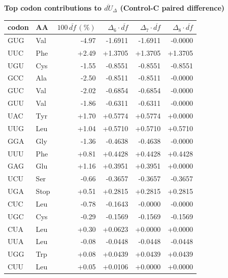 \begingroup
{}
\small
\setlength{\tabcolsep}{6pt}
\renewcommand{\arraystretch}{1.15}
\setlength{\LTleft}{0pt}
\setlength{\LTright}{0pt}
\noindent\textbf{Top codon contributions to $\overline{dU}_{\Delta}$ (Control-C paired difference)}\\
\begin{longtable}{l l r r r r}
\toprule
codon & AA & $100\,\overline{df}\,(\%)$ & $\Delta_{6}\cdot\overline{df}$ & $\Delta_{7}\cdot\overline{df}$ & $\Delta_{8}\cdot\overline{df}$ \\
\midrule
GUG & Val & -4.97 & -1.6911 & -1.6911 & -0.0000 \\
UUC & Phe & +2.49 & +1.3705 & +1.3705 & +1.3705 \\
UGU & Cys & -1.55 & -0.8551 & -0.8551 & -0.8551 \\
GCC & Ala & -2.50 & -0.8511 & -0.8511 & -0.0000 \\
GUC & Val & -2.02 & -0.6854 & -0.6854 & -0.0000 \\
GUU & Val & -1.86 & -0.6311 & -0.6311 & -0.0000 \\
UAC & Tyr & +1.70 & +0.5774 & +0.5774 & +0.0000 \\
UUG & Leu & +1.04 & +0.5710 & +0.5710 & +0.5710 \\
GGA & Gly & -1.36 & -0.4638 & -0.4638 & -0.0000 \\
UUU & Phe & +0.81 & +0.4428 & +0.4428 & +0.4428 \\
GAG & Glu & +1.16 & +0.3951 & +0.3951 & +0.0000 \\
UCU & Ser & -0.66 & -0.3657 & -0.3657 & -0.3657 \\
UGA & Stop & +0.51 & +0.2815 & +0.2815 & +0.2815 \\
CUC & Leu & -0.78 & -0.1643 & -0.0000 & -0.0000 \\
UGC & Cys & -0.29 & -0.1569 & -0.1569 & -0.1569 \\
CUA & Leu & +0.30 & +0.0623 & +0.0000 & +0.0000 \\
UUA & Leu & -0.08 & -0.0448 & -0.0448 & -0.0448 \\
UGG & Trp & +0.08 & +0.0439 & +0.0439 & +0.0439 \\
CUU & Leu & +0.05 & +0.0106 & +0.0000 & +0.0000 \\
\bottomrule
\end{longtable}
\endgroup

